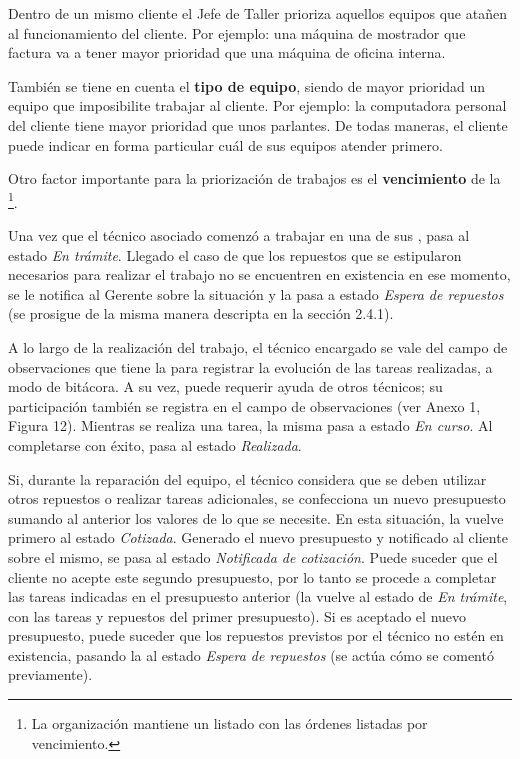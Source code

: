 \documentclass[12pt]{extarticle}
\begin{document}
\begin{spacing}{1.2}
    Dentro de un mismo cliente el Jefe de Taller prioriza aquellos equipos que atañen al funcionamiento del cliente. Por ejemplo: una máquina de mostrador que factura va a tener mayor prioridad que una máquina de oficina interna.

    También se tiene en cuenta el \textbf{tipo de equipo}, siendo de mayor prioridad un equipo que imposibilite trabajar al cliente. Por ejemplo: la computadora personal del cliente tiene mayor prioridad que unos parlantes.
    De todas maneras, el cliente puede indicar en forma particular cuál de sus equipos atender primero.

    Otro factor importante para la priorización de trabajos es el \textbf{vencimiento} de la \OT{}\footnote{La organización mantiene un listado con las órdenes listadas por vencimiento.}. 
    
    Una vez que el técnico asociado comenzó a trabajar en una de sus \OT{}, pasa al estado \textit{En trámite}. Llegado el caso de que los repuestos que se estipularon necesarios para realizar el trabajo no se encuentren en existencia en ese momento, se le notifica al Gerente sobre la situación y la \OT{} pasa a estado \textit{Espera de repuestos} (se prosigue de la misma manera descripta en la sección 2.4.1).

    A lo largo de la realización del trabajo, el técnico encargado se vale del campo de observaciones que tiene la \OT{} para registrar la evolución de las tareas realizadas, a modo de bitácora. A su vez, puede requerir ayuda de otros técnicos; su participación también se registra en el campo de observaciones (ver Anexo 1, Figura 12). Mientras se realiza una tarea, la misma pasa a estado \textit{En curso}. Al completarse con éxito, pasa al estado \textit{Realizada}.
    
    Si, durante la reparación del equipo, el técnico considera que se deben utilizar otros repuestos o realizar tareas adicionales, se confecciona un nuevo presupuesto sumando al anterior los valores de lo que se necesite. En esta situación, la \OT{} vuelve primero al estado \textit{Cotizada}. Generado el nuevo presupuesto y notificado al cliente sobre el mismo, se pasa al estado \textit{Notificada de cotización}. Puede suceder que el cliente no acepte este segundo presupuesto, por lo tanto se procede a completar las tareas indicadas en el presupuesto anterior (la \OT{} vuelve al estado de \textit{En trámite}, con las tareas y repuestos del primer presupuesto). Si es aceptado el nuevo presupuesto, puede suceder que los repuestos previstos por el técnico no estén en existencia, pasando la \OT{} al estado \textit{Espera de repuestos} (se actúa cómo se comentó previamente).
    

\end{spacing}
\end{document}
